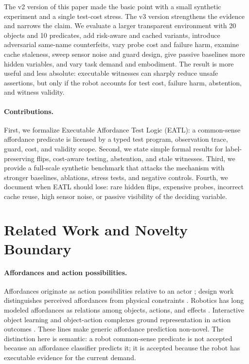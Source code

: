 \documentclass{article}
\begin{document}
The v2 version of this paper made the basic point with a small synthetic
experiment and a single test-cost stress.  The v3 version strengthens the
evidence and narrows the claim.  We evaluate a larger transparent environment
with 20 objects and 10 predicates, add risk-aware and cached variants, introduce
adversarial same-name counterfeits, vary probe cost and failure harm, examine
cache staleness, sweep sensor noise and guard design, give passive baselines
more hidden variables, and vary task demand and embodiment.  The result is more
useful and less absolute: executable witnesses can sharply reduce unsafe
assertions, but only if the robot accounts for test cost, failure harm,
abstention, and witness validity.

\paragraph{Contributions.}
First, we formalize Executable Affordance Test Logic (EATL): a common-sense
affordance predicate is licensed by a typed test program, observation trace,
guard, cost, and validity scope.  Second, we state simple formal results for
label-preserving flips, cost-aware testing, abstention, and stale witnesses.
Third, we provide a full-scale synthetic benchmark that attacks the mechanism
with stronger baselines, ablations, stress tests, and negative controls.  Fourth,
we document when EATL should lose: rare hidden flips, expensive probes,
incorrect cache reuse, high sensor noise, or passive visibility of the deciding
variable.

\section{Related Work and Novelty Boundary}

\paragraph{Affordances and action possibilities.}
Affordances originate as action possibilities relative to an actor
\citep{gibson1979ecological}; design work distinguishes perceived affordances
from physical constraints \citep{norman1988psychology}.  Robotics has long
modeled affordances as relations among objects, actions, and effects
\citep{sahin2007afford,montesano2008learning,stoytchev2005behavior}.
Interactive object learning and object-action complexes ground representation
in action outcomes \citep{fitzpatrick2003learning,kruger2011object}.  These
lines make generic affordance prediction non-novel.  The distinction here is
semantic: a robot common-sense predicate is not accepted because an affordance
classifier predicts it; it is accepted because the robot has executable evidence
for the current demand.
\end{document}
